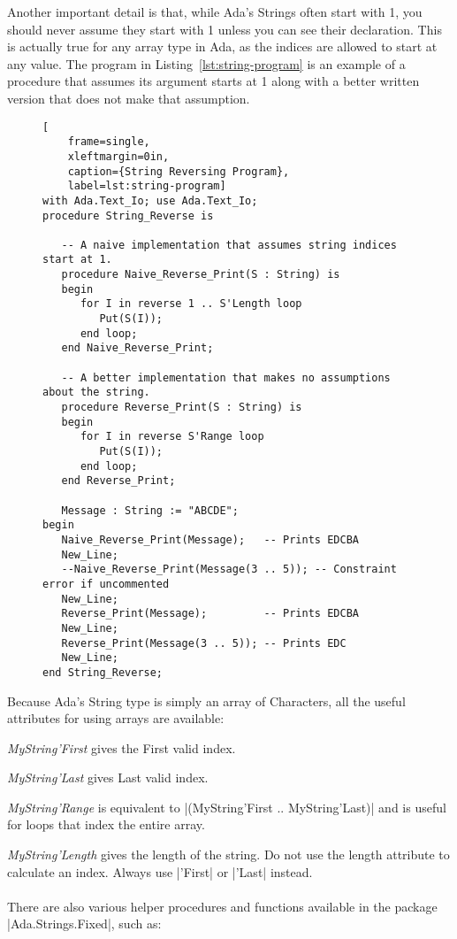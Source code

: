 Another important detail is that, while Ada's Strings often start with 1, you should never
assume they start with 1 unless you can see their declaration. This is actually true for any
array type in Ada, as the indices are allowed to start at any value. The program in
Listing~\ref{lst:string-program} is an example of a procedure that assumes its argument starts
at 1 along with a better written version that does not make that assumption.

\begin{figure}[tbhp]
\begin{lstlisting}[
    frame=single,
    xleftmargin=0in,
    caption={String Reversing Program},
    label=lst:string-program]
with Ada.Text_Io; use Ada.Text_Io;
procedure String_Reverse is

   -- A naive implementation that assumes string indices start at 1.
   procedure Naive_Reverse_Print(S : String) is
   begin
      for I in reverse 1 .. S'Length loop
         Put(S(I));
      end loop;
   end Naive_Reverse_Print;

   -- A better implementation that makes no assumptions about the string.
   procedure Reverse_Print(S : String) is
   begin
      for I in reverse S'Range loop
         Put(S(I));
      end loop;
   end Reverse_Print;

   Message : String := "ABCDE";
begin
   Naive_Reverse_Print(Message);   -- Prints EDCBA
   New_Line;
   --Naive_Reverse_Print(Message(3 .. 5)); -- Constraint error if uncommented
   New_Line;
   Reverse_Print(Message);         -- Prints EDCBA
   New_Line;
   Reverse_Print(Message(3 .. 5)); -- Prints EDC
   New_Line;
end String_Reverse;   
\end{lstlisting}    
\end{figure}


Because Ada's String type is simply an array of Characters, all the useful attributes for using
arrays are available:

\emph{MyString'First} gives the First valid index.

\emph{MyString'Last} gives Last valid index.

\emph{MyString'Range} is equivalent to |(MyString'First .. MyString'Last)| and is useful for
loops that index the entire array.

\emph{MyString'Length} gives the length of the string. Do not use the length attribute to
calculate an index. Always use |'First| or |'Last| instead.
\\\\ %
There are also various helper procedures and functions available in the package
|Ada.Strings.Fixed|, such as:

